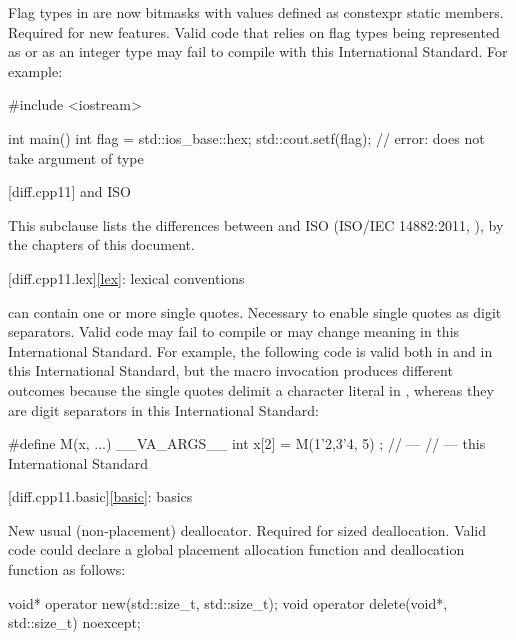 \change Flag types in  are now bitmasks with values
defined as constexpr static members.
\rationale Required for new features.
\effect
Valid \CppIII{} code that relies on  flag types being
represented as  or as an integer type may fail to compile
with this International Standard. For example:

\begin{codeblock}
#include <iostream>

int main() {
  int flag = std::ios_base::hex;
  std::cout.setf(flag);         // error:  does not take argument of type 
}
\end{codeblock}

[diff.cpp11]{\Cpp{} and ISO \CppXI{}}

\pnum
{}%
This subclause lists the differences between \Cpp{} and
ISO \CppXI{} (ISO/IEC 14882:2011, ),
by the chapters of this document.

[diff.cpp11.lex]{\ref{lex}: lexical conventions}

\change {} can contain one or more single quotes.
\rationale Necessary to enable single quotes as digit separators.
\effect Valid \CppXI{} code may fail to compile or may change meaning in this
International Standard. For example, the following code is valid both in \CppXI{} and in
this International Standard, but the macro invocation produces different outcomes
because the single quotes delimit a character literal in \CppXI{}, whereas they are digit
separators in this International Standard:

\begin{codeblock}
#define M(x, ...) __VA_ARGS__
int x[2] = { M(1'2,3'4, 5) };
//  --- \CppXI{}
//  --- this International Standard
\end{codeblock}

[diff.cpp11.basic]{\ref{basic}: basics}

\change New usual (non-placement) deallocator.
\rationale Required for sized deallocation.
\effect Valid \CppXI{} code could declare a global placement allocation function and
deallocation function as follows:

\begin{codeblock}
void* operator new(std::size_t, std::size_t);
void operator delete(void*, std::size_t) noexcept;
\end{codeblock}

